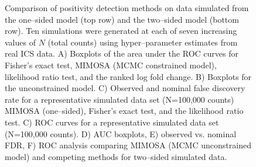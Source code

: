 \documentclass[11pt]{article}
\begin{document}
\begin{figure}[htbp]
   \caption{Comparison of positivity detection methods on data simulated from the one--sided model (top row) and the two--sided model (bottom row). Ten simulations were generated at each of seven increasing values of $N$ (total counts) using hyper--parameter estimates from real ICS data. A) Boxplots of the area under the ROC curves for Fisher's exact test, MIMOSA (MCMC constrained model), likelihood ratio test, and the ranked log fold change. B) Boxplots for the unconstrained model. C) Observed and nominal false discovery rate for a representative simulated data set (N=100,000 counts) MIMOSA (one--sided), Fisher's exact test, and the likelihood ratio test. C) ROC curves for a representative simulated data set (N=100,000 counts). D) AUC  boxplots, E) observed vs. nominal FDR, F) ROC analysis comparing MIMOSA (MCMC unconstrained model) and competing methods for two--sided simulated data. }\label{fig:simulations}
\end{figure}
\end{document}
